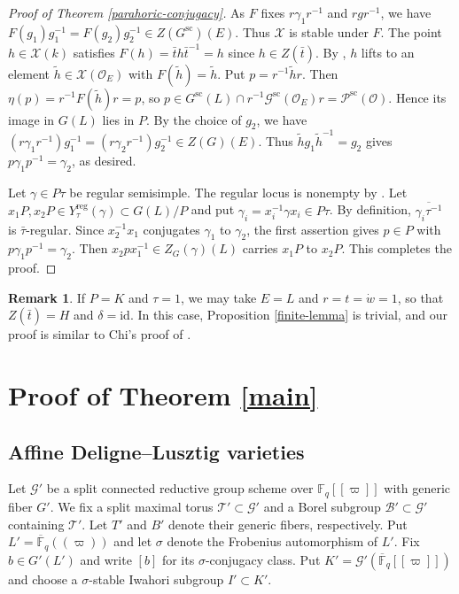 \documentclass[12pt]{article}
\newcommand\F{\mathbb{F}}
\newcommand\cB{\mathcal B}
\newcommand\cO{\mathcal O}
\newcommand\cG{\mathcal G}
\newcommand\cT{\mathcal T}
\newcommand\vp{\varpi}
\theoremstyle{definition}
\newtheorem{rema}[theo]{Remark}
\newcommand{\scs}{\mathrm{sc}}
\newcommand{\reg}{\mathrm{reg}}
\begin{document}
\begin{proof}[Proof of Theorem \ref{parahoric-conjugacy}]
As $F$ fixes $r\gamma_1r^{-1}$ and $rgr^{-1}$, we have $F(g_1)g_1^{-1}=F(g_2)g_2^{-1}\in Z(G^{\scs})(E)$. Thus $\mathcal X$ is stable under $F$. The point $h\in\mathcal X(k)$ satisfies $F(h)=\bar t h\bar t^{-1}=h$ since $h\in Z(\bar t)$. By \cite[Proposition 3.3]{Hartmann12}, $h$ lifts to an element $\widetilde h\in\mathcal X(\cO_E)$ with $F(\widetilde h)=\widetilde h$.
Put $p=r^{-1}\widetilde h r$. Then $\eta(p)=r^{-1}F(\widetilde h)r=p$, so $p\in G^{\scs}(L)\cap r^{-1}\cG^{\scs}(\cO_E)r=\mathcal P^{\scs}(\cO)$. Hence its image in $G(L)$ lies in $P$. By the choice of $g_2$, we have $(r\gamma_1r^{-1})g_1^{-1}=(r\gamma_2r^{-1})g_2^{-1}\in Z(G)(E)$. Thus $\widetilde h g_1\widetilde h^{-1}=g_2$ gives $p\gamma_1p^{-1}=\gamma_2$, as desired.

Let $\gamma\in P\tau$ be regular semisimple. The regular locus is nonempty by \cite[Theorem 3.1(2)]{HeALV}.
Let $x_1P,x_2P\in Y_\tau^{\reg}(\gamma)\subset G(L)/P$ and put $\gamma_i=x_i^{-1}\gamma x_i\in P\tau$. By definition, $\overline{\gamma_i\tau^{-1}}$ is $\bar\tau$-regular.
Since $x_2^{-1}x_1$ conjugates $\gamma_1$ to $\gamma_2$, the first assertion gives $p\in P$ with $p\gamma_1p^{-1}=\gamma_2$.
Then $x_2px_1^{-1}\in Z_G(\gamma)(L)$ carries $x_1P$ to $x_2P$.
This completes the proof.
\end{proof}

\begin{rema}
If $P=K$ and $\tau=1$, we may take $E=L$ and $r=t=\dot w=1$, so that $Z(\bar t)=H$ and $\delta=\mathrm{id}$.
In this case, Proposition \ref{finite-lemma} is trivial, and our proof is similar to Chi's proof of \cite[Lemma 7.5]{Chi26}.
\end{rema}

\section{Proof of Theorem \ref{main}}
\label{proof-main}

\subsection{Affine Deligne--Lusztig varieties}
\label{adlv-subsection}

Let $\cG'$ be a split connected reductive group scheme over $\F_q[[\vp]]$ with generic fiber $G'$.
We fix a split maximal torus $\cT'\subset\cG'$ and a Borel subgroup $\cB'\subset\cG'$ containing $\cT'$.
Let $T'$ and $B'$ denote their generic fibers, respectively.
Put $L'=\overline{\F}_q((\vp))$ and let $\sigma$ denote the Frobenius automorphism of $L'$.
Fix $b\in G'(L')$ and write $[b]$ for its $\sigma$-conjugacy class.
Put $K'=\cG'(\overline{\F}_q[[\vp]])$ and choose a $\sigma$-stable Iwahori subgroup $I'\subset K'$.
\end{document}
